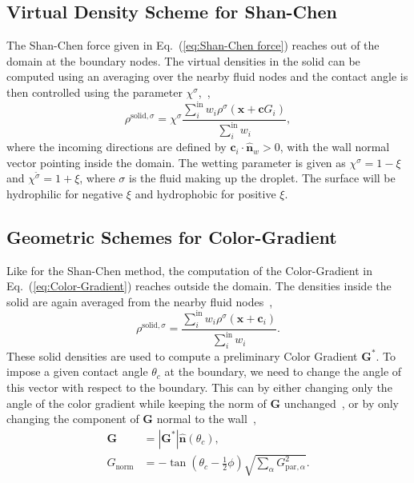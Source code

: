 \documentclass[aps,physrev,twocolumn,10pt]{revtex4-2}
\begin{document}
\subsection{Virtual Density Scheme for Shan-Chen}
The Shan-Chen force given in Eq.~(\ref{eq:Shan-Chen force}) reaches out of the domain at the boundary nodes. The virtual densities in the solid can be computed using an averaging over the nearby fluid nodes and the contact angle is then controlled using the parameter $\chi^\sigma$,~\cite{coelho_wetting_2021},
\begin{equation}
    \rho^{\text{solid}, \sigma} = \chi^\sigma\frac{\sum_i^\text{in} w_i \rho^\sigma\left(\bm{x} + \bm{c}G_i\right)}{\sum_i^{\text{in}} w_i},
\end{equation}
where the incoming directions are defined by $\bm{c}_i \cdot \hat{\bm{n}}_w > 0$, with the wall normal vector pointing inside the domain. The wetting parameter is given as $\chi^\sigma = 1 - \xi$ and $\chi^{\tilde{\sigma}} = 1 + \xi$, where $\sigma$ is the fluid making up the droplet. The surface will be hydrophilic for negative $\xi$ and hydrophobic for positive $\xi$.
\subsection{Geometric Schemes for Color-Gradient}
Like for the Shan-Chen method, the computation of the Color-Gradient in Eq.~(\ref{eq:Color-Gradient}) reaches outside the domain. The densities inside the solid are again averaged from the nearby fluid nodes~\cite{zhang_simplified_2023},
\begin{equation}
    \rho^{\text{solid}, \sigma} = \frac{\sum_i^\text{in} w_i \rho^\sigma\left(\bm{x} + \bm{c}_i\right)}{\sum_i^{\text{in}} w_i}.
\end{equation}
These solid densities are used to compute a preliminary Color Gradient $\bm{G}^*$. To impose a given contact angle $\theta_c$ at the boundary, we need to change the angle of this vector with respect to the boundary. This can by either changing only the angle of the color gradient while keeping the norm of $\bm{G}$ unchanged~\cite{yu_color-gradient_2018}, or by only changing the component of $\bm{G}$ normal to the wall~\cite{ding_wetting_2007}\cite{zhang_wetting_2022},
\begin{equation}
\begin{split}
    \bm{G} &= |\bm{G}^*|\hat{\bm{n}}(\theta_c),\\
    G_\text{norm} &= -\tan\left(\theta_c - \frac{1}{2}\phi\right)\sqrt{\sum_\alpha G^2_{\text{par},\alpha}}.
\end{split}
\end{equation}
\end{document}

